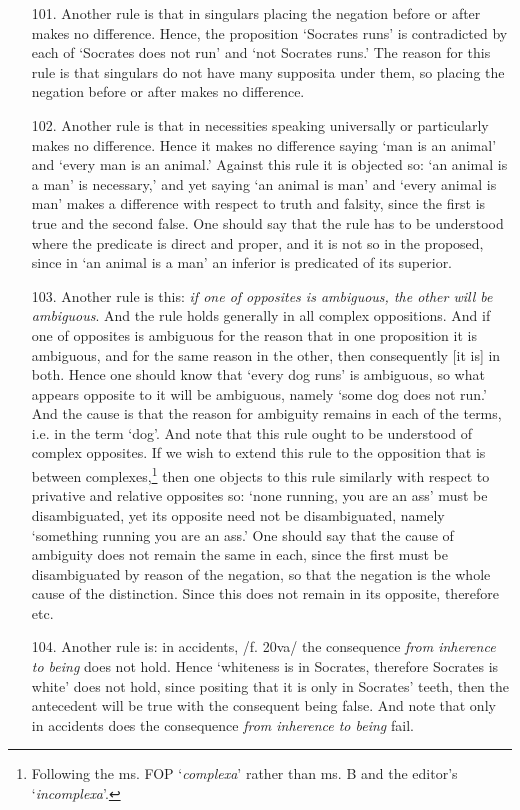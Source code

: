 \documentclass[]{article}
\begin{document}
\begin{itemize}
\item[101.] Another rule is that in singulars placing the negation before or after makes no difference. Hence, the proposition `Socrates runs' is contradicted by each of `Socrates does not run' and `not Socrates runs.' The reason for this rule is that singulars do not have many supposita under them, so placing the negation before or after makes no difference.
\item[102.] Another rule is that in necessities speaking universally or particularly makes no difference. Hence it makes no difference saying `man is an animal' and `every man is an animal.' Against this rule it is objected so: `an animal is a man' is necessary,' and yet saying `an animal is man' and `every animal is man' makes a difference with respect to truth and falsity, since the first is true and the second false. One should say that the rule has to be understood where the predicate is direct and proper, and it is not so in the proposed, since in `an animal is a man' an inferior is predicated of its superior.
\item[103.] Another rule is this: \textit{if one of opposites is ambiguous, the other will be ambiguous}. And the rule holds generally in all complex oppositions. And if one of opposites is ambiguous for the reason that in one proposition it is ambiguous, and for the same reason in the other, then consequently [it is] in both. Hence one should know that `every dog runs' is ambiguous, so what appears opposite to it will be ambiguous, namely `some dog does not run.' And the cause is that the reason for ambiguity remains in each of the terms, i.e. in the term `dog'. And note that this rule ought to be understood of complex opposites. If we wish to extend this rule to the opposition that is between complexes,\footnote{Following the ms. FOP `\textit{complexa}' rather than ms. B and the editor's `\textit{incomplexa}'.}  then one objects to this rule similarly with respect to privative and relative opposites so: `none running, you are an ass' must be disambiguated, yet its opposite need not be disambiguated, namely `something running you are an ass.' One should say that the cause of ambiguity does not remain the same in each, since the first must be disambiguated by reason of the negation, so that the negation is the whole cause of the distinction. Since this does not remain in its opposite, therefore etc.
\item[104.] Another rule is: in accidents, /f. 20va/ the consequence \textit{from inherence to being} does not hold. Hence `whiteness is in Socrates, therefore Socrates is white' does not hold, since positing that it is only in Socrates' teeth, then the antecedent will be true with the consequent being false. And note that only in accidents does the consequence \textit{from inherence to being} fail. 

\end{itemize}
\end{document}
